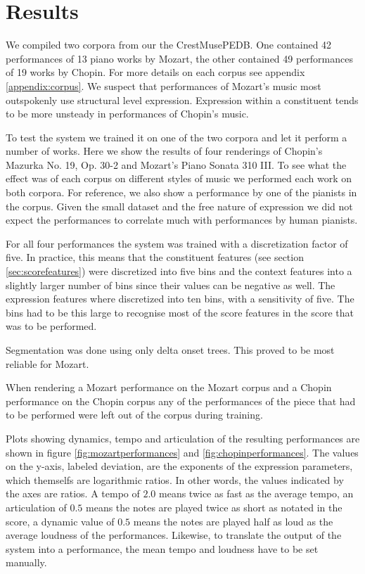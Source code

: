 \documentclass[a4paper,10pt]{article}
\begin{document}
\section{Results}
\label{sec:results}

We compiled two corpora from our the CrestMusePEDB. One contained 42 performances of 13 piano works by Mozart, the other contained 49 performances of 19 works by Chopin. For more details on each corpus see appendix \ref{appendix:corpus}. We suspect that performances of Mozart's music most outspokenly use structural level expression. Expression within a constituent tends to be more unsteady in performances of Chopin's music. 

To test the system we trained it on one of the two corpora and let it perform a number of works. Here we show the results of four renderings of Chopin's Mazurka No. 19, Op. 30-2 and Mozart's Piano Sonata 310 III. To see what the effect was of each corpus on different styles of music we performed each work on both corpora. For reference, we also show a performance by one of the pianists in the corpus. Given the small dataset and the free nature of expression we did not expect the performances to correlate much with performances by human pianists. 

For all four performances the system was trained with a discretization factor of five. In practice, this means that the constituent features (see section \ref{sec:scorefeatures}) were discretized into five bins and the context features into a slightly larger number of bins since their values can be negative as well. The expression features where discretized into ten bins, with a sensitivity of five. The bins had to be this large to recognise most of the score features in the score that was to be performed. 

Segmentation was done using only delta onset trees. This proved to be most reliable for Mozart. 

When rendering a Mozart performance on the Mozart corpus and a Chopin performance on the Chopin corpus any of the performances of the piece that had to be performed were left out of the corpus during training. 

Plots showing dynamics, tempo and articulation of the resulting performances are shown in figure \ref{fig:mozartperformances} and \ref{fig:chopinperformances}. The values on the y-axis, labeled deviation, are the exponents of the expression parameters, which themselfs are logarithmic ratios. In other words, the values indicated by the axes are ratios. A tempo of $2.0$ means twice as fast as the average tempo, an articulation of $0.5$ means the notes are played twice as short as notated in the score, a dynamic value of $0.5$ means the notes are played half as loud as the average loudness of the performances. Likewise, to translate the output of the system into a performance, the mean tempo and loudness have to be set manually. 
\end{document}
